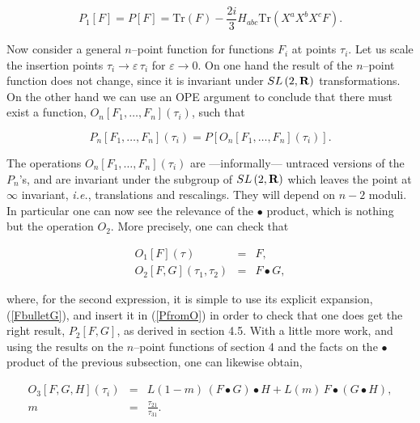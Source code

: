\documentclass[a4paper,11pt]{article}
\newcommand{\mathbb}[1]{{\bf{#1}}}
\begin{document}
$$
P_{1}\left[ F\right] =P\left[ F\right] =\mathrm{Tr}\left( F\right) - 
\frac{2i}{3}H_{abc}\mathrm{Tr}\left( X^{a}X^{b}X^{c}F\right) .
$$

\noindent
Now consider a general $n$--point function for functions $F_{i}$ at points
$\tau_{i}$. Let us scale the insertion points $\tau_{i} \rightarrow
\varepsilon \, \tau_{i}$ for $\varepsilon \rightarrow 0$. On one hand the
result of the $n$--point function does not change, since it is invariant
under $SL\left( 2,\mathbb{R}\right)$ transformations. On the other hand we
can use an OPE argument to conclude that there must exist a function,
$O_{n} \left[ F_{1}, \dots, F_{n} \right] \left( \tau_{i}\right)$, such
that

\begin{equation} \label{PfromO}
P_{n}\left[ F_{1}, \dots, F_{n}\right] \left( \tau _{i}\right) = P \left[
O_{n} \left[ F_{1}, \dots, F_{n}\right] \left( \tau _{i}\right) \right].
\end{equation}

\noindent
The operations $O_{n} \left[ F_{1}, \dots, F_{n} \right] \left( \tau_{i}
\right)$ are ---informally--- untraced versions of the $P_{n}$'s, and are
invariant under the subgroup of $SL\left( 2,\mathbb{R}\right)$ which leaves
the point at $\infty$ invariant, \textit{i.e.}, translations and
rescalings. They will depend on $n-2$ moduli. In particular one can now see
the relevance of the $\bullet$ product, which is nothing but the operation
$O_{2}$. More precisely, one can check that

\begin{eqnarray*}
O_{1}\left[ F\right] \left( \tau \right) &=&F , \\
O_{2}\left[ F,G\right] \left( \tau _{1},\tau _{2}\right) &=& F\bullet G ,
\end{eqnarray*}

\noindent
where, for the second expression, it is simple to use its explicit
expansion, (\ref{FbulletG}), and insert it in (\ref{PfromO}) in order to
check that one does get the right result, $P_{2} [F,G]$, as derived in
section 4.5. With a little more work, and using the results on the
$n$--point functions of section 4 and the facts on the $\bullet$ product
of the previous subsection, one can likewise obtain,

\begin{eqnarray*}
O_{3}\left[ F,G,H\right] \left( \tau _{i}\right) &=&L\left( 1-m\right)
\,\left( F\bullet G\right) \bullet H+L\left( m\right) \,F\bullet \left(
G\bullet H\right) , \\
m &=&\frac{\tau _{21}}{\tau _{31}}.
\end{eqnarray*}
\end{document}
